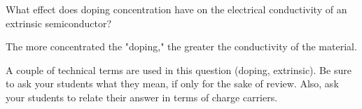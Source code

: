 

What effect does doping concentration have on the electrical conductivity of an extrinsic semiconductor?







The more concentrated the "doping," the greater the conductivity of the material.







A couple of technical terms are used in this question (doping, extrinsic).  Be sure to ask your students what they mean, if only for the sake of review.  Also, ask your students to relate their answer in terms of charge carriers.




